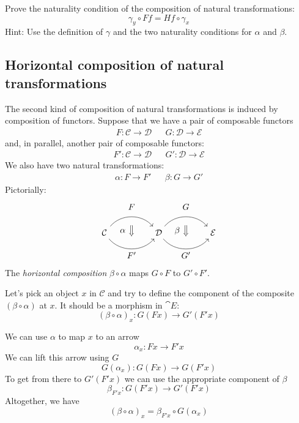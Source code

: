 \documentclass[DaoFP]{subfiles}
\begin{document}
\begin{exercise}
Prove the naturality condition of the composition of natural transformations:
\[ \gamma_y \circ F f = H f \circ \gamma_x \]
Hint: Use the definition of $\gamma$ and the two naturality conditions for $\alpha$ and $\beta$.
\end{exercise}


\subsection{Horizontal composition of natural transformations}

The second kind of composition of natural transformations is induced by composition of functors. Suppose that we have a pair of composable functors
\begin{align*}
 F \colon \mathcal{C} \to \mathcal{D}
&&G \colon \mathcal{D} \to \mathcal{E} 
\end{align*}
and, in parallel, another pair of composable functors:
\begin{align*}
 F' \colon \mathcal{C} \to \mathcal{D}
&& G' \colon \mathcal{D} \to \mathcal{E} 
\end{align*}
We also have two natural transformations:
\begin{align*}
\alpha \colon F \to F'  
&& \beta \colon G \to G' 
\end{align*}
Pictorially:
\[
\begin{tikzcd}[column sep=huge]
\mathcal{C}
  \arrow[bend left=50]{r}[name=U, label=above:$F$]{}
  \arrow[bend right=50]{r}[name=D, label=below:$F'$]{} 
 &
\mathcal{D}
  \arrow[bend left=50]{r}[name=U1, label=above:$G$]{}
  \arrow[bend right=50]{r}[name=D1, label=below:$G'$]{} 
 &
\mathcal{E}
  \arrow[shorten <=10pt,shorten >=10pt,Rightarrow,to path={(U) -- node[label=left:$\alpha$] {} (D)}]{}
  \arrow[shorten <=10pt,shorten >=10pt,Rightarrow,to path={(U1) -- node[label=left:$\beta$] {} (D1)}]{}
\end{tikzcd}
\]
The \emph{horizontal composition} $\beta \circ \alpha$ maps $G \circ F$ to $G' \circ F'$.

Let's pick an object $x$ in $\mathcal{C}$ and try to define the component of the composite $(\beta \circ \alpha)$ at $x$. It should be a morphism in $\cat E$:
\[ (\beta \circ \alpha)_x \colon G ( F x) \to G' ( F' x) \]

We can use $\alpha$ to map $x$ to an arrow 
\[ \alpha_x \colon F x \to F' x \]
We can lift this arrow using $G$
\[ G (\alpha_x) \colon G (F x) \to G (F' x) \]
To get from there to $G' (F' x)$ we can use the appropriate component of $\beta$
\[ \beta_{F' x} \colon G (F' x) \to G' (F' x) \]
Altogether, we have
\[ (\beta \circ \alpha)_x = \beta_{F' x} \circ G (\alpha_x) \]
\end{document}
